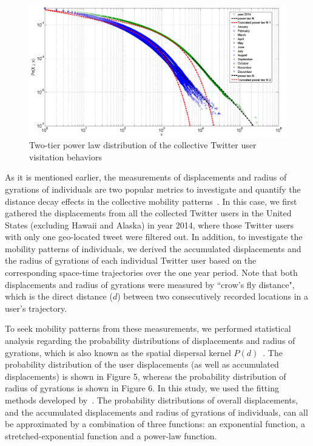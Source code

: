 \documentclass[a4paper, 11pt]{article}
\begin{document}
\begin{figure}[h]
\centering
\includegraphics[width=1.0\linewidth]{./figures/visitation2}
\caption{Two-tier power law distribution of the collective Twitter user visitation behaviors}
\label{fig:Arch}
\end{figure}
\FloatBarrier

As it is mentioned earlier, the measurements of displacements and radius of gyrations of individuals are two popular metrics to investigate and quantify the distance decay effects in the collective mobility patterns~\citep{gonzalez2008understanding}. In this case, we first gathered the displacements from all the collected Twitter users in the United States (excluding Hawaii and Alaska) in year 2014, where those Twitter users with only one geo-located tweet were filtered out. 
In addition, to investigate the mobility patterns of individuals, we derived the accumulated displacements and the radius of gyrations of each individual Twitter user based on the corresponding space-time trajectories over the one year period.
Note that both displacements and radius of gyrations were measured by ``crow's fly distance", which is the direct distance ($d$) between two consecutively recorded locations in a user's trajectory.

To seek mobility patterns from these measurements, we performed statistical analysis regarding the probability distributions of displacements and radius of gyrations, which is also known as the spatial dispersal kernel $P(d)$~\citep{brockmann2006scaling}. The probability distribution of the user displacements (as well as accumulated displacements) is shown in Figure 5, whereas the probability distribution of radius of gyrations is shown in Figure 6. In this study, we used the fitting methods developed by~\citep{Jurdak2015}. The probability distributions of overall displacements, and the accumulated displacements and radius of gyrations of individuals, can all be approximated by a combination of three functions: an exponential function, a stretched-exponential function and a power-law function.
\end{document}
